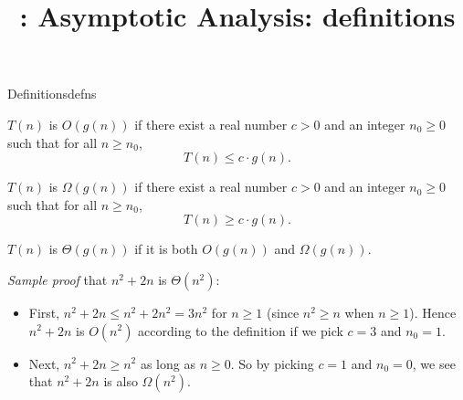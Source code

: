 \documentclass{tufte-handout}
\title{\thecourse: Asymptotic Analysis: definitions}
\date{}
\begin{document}
\maketitle

\begin{model*}{Definitions}{defns}
  \begin{defn}[Big-O] 
    $T(n)$ is $O(g(n))$ if there exist a real number $c > 0$ and an
    integer $n_0 \geq 0$ such that for all $n \geq n_0$,
    \[ T(n) \leq c \cdot g(n). \]
  \end{defn}

  \begin{defn} 
    $T(n)$ is $\Omega(g(n))$ if there exist a real number $c > 0$ and an
    integer $n_0 \geq 0$ such that
    for all $n \geq n_0$, \[ T(n) \geq c \cdot g(n). \]
  \end{defn}

  \begin{defn} 
    $T(n)$ is $\Theta(g(n))$ if it is both $O(g(n))$ and $\Omega(g(n))$.
  \end{defn}

  \emph{Sample proof} that $n^2 + 2n$ is $\Theta(n^2)$:
  \begin{itemize}
  \item First, $n^2 + 2n \leq n^2 + 2n^2 = 3n^2$ for $n \geq 1$ (since
    $n^2 \geq n$ when $n \geq 1$).  Hence $n^2 + 2n$ is $O(n^2)$
    according to the definition if we pick $c = 3$ and $n_0 = 1$.
  \item Next, $n^2 + 2n \geq n^2$ as long as $n \geq 0$.  So by
    picking $c = 1$ and $n_0 = 0$, we see that $n^2 + 2n$ is also
    $\Omega(n^2)$.
  \end{itemize}
\end{model*}
\end{document}
